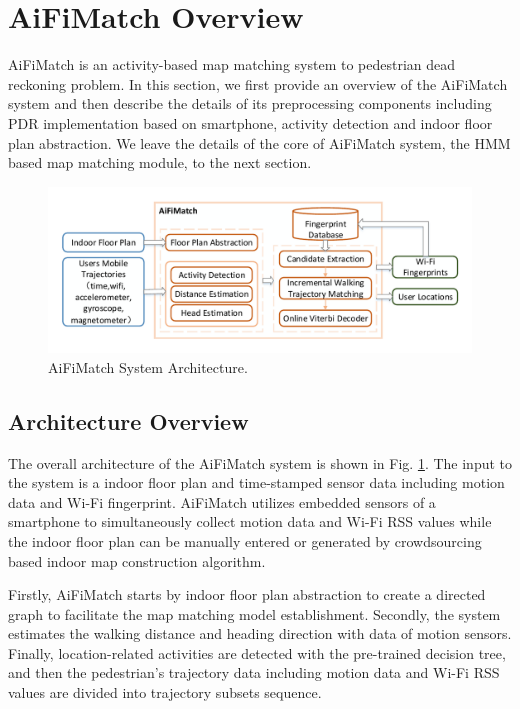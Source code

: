 \documentclass[conference]{IEEEtran}
\begin{document}
\section{AiFiMatch Overview}

AiFiMatch is an activity-based map matching system to pedestrian dead reckoning problem. In this section, we first provide an overview of the AiFiMatch system and then describe the details of its preprocessing components including PDR implementation based on smartphone, activity detection and indoor floor plan abstraction. We leave the details of the core of AiFiMatch system, the HMM based map matching module, to the next section.

\begin{figure}[htbp]
	\centerline{\includegraphics[width=5.85in]{AiFiMatch-Architecture}}
	\caption{AiFiMatch System Architecture.}
	\label{fig-architecture}
\end{figure}

\subsection{Architecture Overview}

The overall architecture of the AiFiMatch system is shown in Fig. \ref{fig-architecture}. The input to the system is a indoor floor plan and time-stamped sensor data including motion data and Wi-Fi fingerprint. AiFiMatch utilizes embedded sensors of a smartphone to simultaneously collect motion data and Wi-Fi RSS values while the indoor floor plan can be manually entered or generated by crowdsourcing based indoor map construction algorithm.

Firstly, AiFiMatch starts by indoor floor plan abstraction to create a directed graph to facilitate the map matching model establishment. Secondly, the system estimates the walking distance and heading direction with data of motion sensors. Finally, location-related activities are detected with the pre-trained decision tree, and then the pedestrian's trajectory data including motion data and Wi-Fi RSS values are divided into trajectory subsets sequence.  
\end{document}
